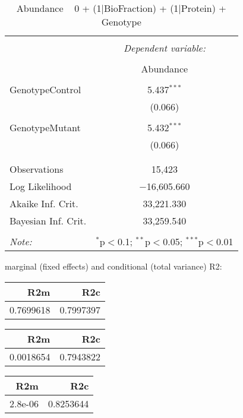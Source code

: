 \documentclass[11pt]{report}
\begin{document}
\begin{table}[!htbp] \centering 
  \caption{Abundance ~ 0 + (1|BioFraction) + (1|Protein) + Genotype} 
  \label{} 
\begin{tabular}{@{\extracolsep{5pt}}lc} 
\\[-1.8ex]\hline 
\hline \\[-1.8ex] 
 & \multicolumn{1}{c}{\textit{Dependent variable:}} \\ 
\cline{2-2} 
\\[-1.8ex] & Abundance \\ 
\hline \\[-1.8ex] 
 GenotypeControl & 5.437$^{***}$ \\ 
  & (0.066) \\ 
  & \\ 
 GenotypeMutant & 5.432$^{***}$ \\ 
  & (0.066) \\ 
  & \\ 
\hline \\[-1.8ex] 
Observations & 15,423 \\ 
Log Likelihood & $-$16,605.660 \\ 
Akaike Inf. Crit. & 33,221.330 \\ 
Bayesian Inf. Crit. & 33,259.540 \\ 
\hline 
\hline \\[-1.8ex] 
\textit{Note:}  & \multicolumn{1}{r}{$^{*}$p$<$0.1; $^{**}$p$<$0.05; $^{***}$p$<$0.01} \\ 
\end{tabular} 
\end{table} 
marginal (fixed effects) and conditional (total variance) R2:

\begin{tabular}{r|r}
\hline
R2m & R2c\\
\hline
0.7699618 & 0.7997397\\
\hline
\end{tabular}

\begin{tabular}{r|r}
\hline
R2m & R2c\\
\hline
0.0018654 & 0.7943822\\
\hline
\end{tabular}

\begin{tabular}{r|r}
\hline
R2m & R2c\\
\hline
2.8e-06 & 0.8253644\\
\hline
\end{tabular}
\end{document}
